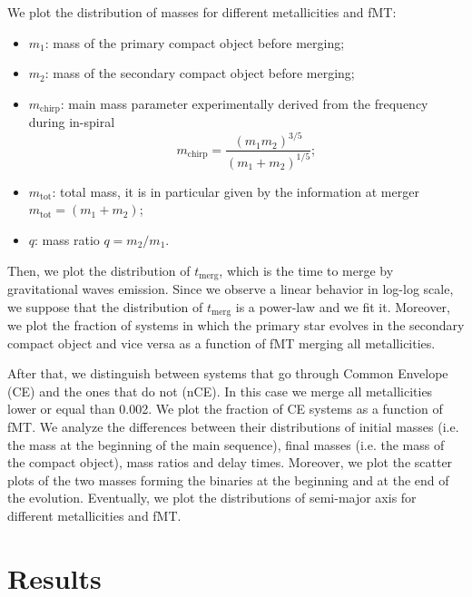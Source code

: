 \documentclass[prb,twocolumn,9pt]{revtex4-1}
\begin{document}
We plot the distribution of masses for different metallicities and fMT:
\begin{itemize}
    \item \(m_1\): mass of the primary compact object before merging;
    \item \(m_2\): mass of the secondary compact object before merging;
    \item \(m_{\text{chirp}} \): main mass parameter experimentally derived from the frequency during in-spiral
        \begin{equation*}
            m_{\text{chirp}} = \frac{(m_1 m_2)^{3/5}}{(m_1+m_2)^{1/5}};
        \end{equation*}
   \item \( m_{\text{tot}}\): total mass, it is in particular given by the information at merger \( m_{\text{tot}}  = (m_1+m_2) \);
   \item \(q\): mass ratio \(q  = m_2/m_1 \).
\end{itemize}
Then, we plot the distribution of \(t_{\text{merg}}\),  which is the time to merge by gravitational waves emission. Since we observe a linear behavior in log-log scale, we suppose that the distribution of \(t_{\text{merg}}\) is a power-law and we fit it. 
Moreover, we plot the fraction of systems in which the primary star evolves in the secondary compact object and vice versa as a function of fMT merging all metallicities.

After that, we distinguish between systems that go through Common Envelope (CE) and the ones that do not (nCE). In this case we merge all metallicities lower or equal than 0.002.
We plot the fraction of CE systems as a function of fMT.
We analyze the differences between their distributions of initial masses (i.e. the mass at the beginning of the main sequence), final masses (i.e. the mass of the compact object), mass ratios and delay times. 
Moreover, we plot the scatter plots of the two masses forming the binaries at the beginning and at the end of the evolution. 
Eventually, we plot the distributions of semi-major axis for different metallicities and fMT.



\section{Results}
\label{sec:results}
\end{document}
